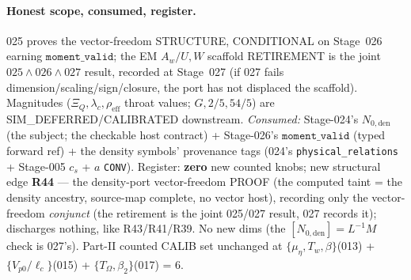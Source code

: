 \paragraph{Honest scope, consumed, register.}
025 proves the vector-freedom STRUCTURE, CONDITIONAL on Stage~026 earning \(\texttt{moment\_valid}\); the
EM \(A_w/U,W\) scaffold RETIREMENT is the joint \(025\wedge026\wedge027\) result, recorded at Stage~027
(if 027 fails dimension/scaling/sign/closure, the port has not displaced the scaffold). Magnitudes
(\(\Xi_Q,\lambda_c,\rho_{\mathrm{eff}}\) throat values; \(G,2/5,54/5\)) are SIM\_DEFERRED/CALIBRATED
downstream. \emph{Consumed:} Stage-024's \(N_{0,\mathrm{den}}\) (the subject; the checkable host contract)
+ Stage-026's \(\texttt{moment\_valid}\) (typed forward ref) + the density symbols' provenance tags
(024's \texttt{physical\_relations} + Stage-005 \(c_s\) + \(a\) \texttt{CONV}). Register: \textbf{zero} new
counted knobs; new structural edge \textbf{R44} --- the density-port vector-freedom PROOF (the computed
taint = the density ancestry, source-map complete, no vector host), recording only the vector-freedom
\emph{conjunct} (the retirement is the joint 025/027 result, 027 records it); discharges nothing, like
R43/R41/R39. No new dims (the \([N_{0,\mathrm{den}}]=L^{-1}M\) check is 027's). Part-II counted CALIB set
unchanged at \(\{\mu_\eta,T_w,\beta\}\)(013) + \(\{V_{p0}/\ell_c\}\)(015) + \(\{T_\Omega,\beta_2\}\)(017)
= 6.

